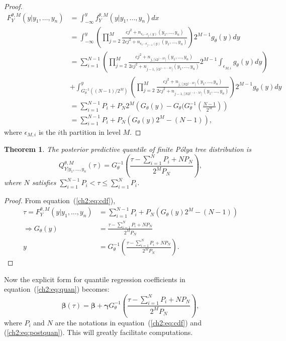 \documentclass[12pt]{article}
\newtheorem{thm}{Theorem}[section]
\newcommand{\polya}{P\'{o}lya}
\begin{document}
\begin{proof}
  \begin{align*}
    F^{\theta,M}_Y(y| y_1, \ldots, y_n) & = \int_{-\infty}^y
    f_Y^{\theta,M} (y|y_1, \ldots, y_n) dx \\
    & = \int_{-\infty}^y \left( \prod_{j=2}^M \frac{cj^2 +
        n_{\epsilon_1 \cdots \epsilon_j(y) }(y_1, \ldots, y_n)}{2cj^2
        + n_{\epsilon_1 \cdots \epsilon_{j-1}(y)}(y_1, \ldots, y_n)}
    \right)2^{M-1} g_\theta(y) dy \\
    & = \sum_{i=1}^{N-1} \left( \prod_{j=2}^M \frac{cj^2 + n_{j,
          \lceil i2^{j-M} \rceil}(y_1, \ldots, y_n)}{2cj^2 + n_{j-1,
          \lceil i2^{j-1-M} \rceil}(y_1, \ldots, y_n)} 2^{M-1}
      \int_{\epsilon_{M,i}} g_{\theta}(y) dy \right) \\
    &+ \int_{G^{-1}_{\theta}((N-1)/2^M)}^y \left( \prod_{j=2}^M
      \frac{cj^2 + n_{j, \lceil N2^{j-M} \rceil}(y_1, \ldots,
        y_n)}{2cj^2 + n_{j-1, \lceil N2^{j-1-M} \rceil}(y_1, \ldots,
        y_n)}\right) 2^{M-1}
    g_{\theta}(y) dy \\
    & = \sum_{i=1}^{N-1} P_i + P_N 2^M \left( G_{\theta}(y) -
      G_{\theta}(G_{\theta}^{-1}\left( \frac{N-1}{2^M} \right)\right)\\
    & = \sum_{i=1}^{N-1}P_i + P_N \left( G_{\theta}(y) 2^M - (N-1)
    \right),
  \end{align*}
  where $\epsilon_{M,i}$ is the $i$th partition in level $M$.
\end{proof}

\begin{thm}
  The posterior predictive quantile of finite \polya{} tree
  distribution is
  \begin{equation}
    \label{ch2:eq:postquan}
    Q^{\theta, M}_{Y|y_1, \ldots, y_n}(\tau) = G^{-1}_{\theta} \left(
      \frac{\tau- \sum_{i=1}^N P_i + N P_N}{2^M P_N} \right),
  \end{equation}
  where $N$ satisfies $ \sum_{i=1}^{N-1} P_i < \tau \le \sum_{i=1}^N
  P_i$.
\end{thm}

\begin{proof}
  From equation~(\ref{ch2:eq:cdf}),
  \begin{align*}
    \tau = F^{\theta,M}_Y(y|y_1, \ldots, y_n) &= \sum_{i=1}^{N-1}
    P_{i} + P_N
    \left( G_{\theta}(y)2^M -(N-1) \right) \\
    \Rightarrow G_{\theta}(y) &= \frac{\tau - \sum_{i=1}^NP_i +
      NP_N}{2^MP_N} \\
    y & = G_{\theta}^{-1} \left(\frac{\tau - \sum_{i=1}^NP_i +
        NP_N}{2^MP_N} \right).
  \end{align*}
\end{proof}
Now the explicit form for quantile regression coefficients in equation~(\ref{ch2:eq:quan}) becomes:
\begin{equation}
  \label{ch2:eq:newquan}
  \bm{\beta}(\tau) = \bm{\beta} + \bm{\gamma}G_{\theta}^{-1}
  \left(\frac{\tau - \sum_{i=1}^NP_i +
      NP_N}{2^MP_N}  \right),
\end{equation}
where $P_i$ and $N$ are the notations in equation~(\ref{ch2:eq:cdf}) and
(\ref{ch2:eq:postquan}). This will greatly facilitate computations.
\end{document}
